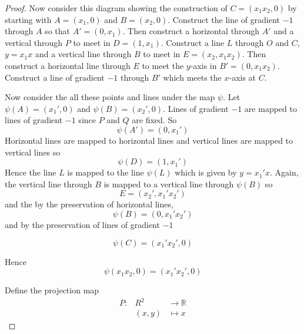 \documentclass[honours]{UNSWthesis}
\newcommand{\R}{\mathbb{R}}
\newcommand{\1}{\mathbf{e}_{1}}
\newcommand{\2}{\mathbf{e}_{3}}
\newcommand{\3}{\mathbf{e}_{3}}
\begin{document}
\begin{proof}
Now consider this diagram showing the construction of $C=(x_{1}x_{2},0)$ by starting with $A=(x_{1},0)$ and $B=(x_{2},0)$. Construct the line of gradient $-1$ through $A$ so that $A'=(0,x_{1})$. Then construct a horizontal through $A'$ and a vertical through $P$ to meet in $D=(1,x_{1})$. Construct a line $L$ through $O$ and $C$, $y=x_{1}x$ and a vertical line through $B$ to meet in $E=(x_{2}, x_{1}x_{2})$. Then construct a horizontal line through $E$ to meet the $y$-axis in $B'=(0,x_{1}x_{2})$. Construct a line of gradient $-1$ through $B'$ which meets the $x$-axis at $C$. 

Now consider the all these points and lines under the map $\psi$. Let $\psi(A)=(x_{1}',0)$ and $\psi(B)=(x_{2}',0) $. Lines of gradient $-1$ are mapped to lines of gradient $-1$ since $P$ and $Q$ are fixed. So 
\[
\psi(A')=(0,x_{1}')
\]
Horizontal lines are mapped to horizontal lines and vertical lines are mapped to vertical lines so
\[
\psi(D)=(1,x_{1}')
\]
Hence the line $L$ is mapped to the line $\psi(L)$ which is given by $y=x_{1}'x$. Again, the vertical line through $B$ is mapped to a vertical line through $\psi(B)$ so 
\[
E=(x_{2}',x_{1}'x_{2}')
\]
and the by the preservation of horizontal lines, 
\[
\psi(B)=(0,x_{1}'x_{2}')
\]
and by the preservation of lines of gradient $-1$


\[
\psi(C)=(x_{1}'x_{2}',0)
\]

Hence 
\begin{equation}\label{axismultmap}
\psi(x_{1}x_{2},0)= (x_{1}'x_{2}',0)
\end{equation}

Define the projection map
\begin{eqnarray*}
P: &R^{2}& \longrightarrow \R \\
&(x,y)& \longmapsto x
\end{eqnarray*}


\end{proof}
\end{document}
